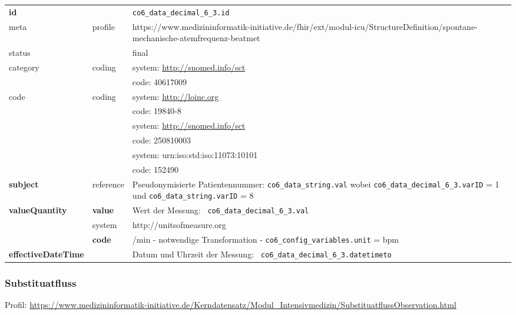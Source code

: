 \begin{longtable}{|l|l|p{7.5cm}|}
        \hline
        \rowcolor{lightgray} \multicolumn{3}{|l|}{Data Mapping (inhaltlich)} \\ \hline
        \textbf{id} &  & \texttt{co6\_data\_decimal\_6\_3.id} \\ \hline
	meta & profile & https://www.medizininformatik-initiative.de/fhir/ext/modul-icu/StructureDefinition/spontane-mechanische-atemfrequenz-beatmet \\ \hline 
	status &  & final   \\ \hline 
	category & coding & system: \url{http://snomed.info/sct} \\
\cline{3-3}
	& & code: 40617009 \\ \hline
	code & coding & system: \url{http://loinc.org} \\ 
	\cline{3-3} 
	&  & code: 19840-8 \\ 
	\cline{3-3} 
	&  & system: \url{http://snomed.info/sct} \\ 
	\cline{3-3}
	&  & code: 250810003 \\ 
	\cline{3-3} 
	&  & system: urn:iso:std:iso:11073:10101 \\ 
	\cline{3-3}
	&  & code: 152490 \\ \hline
	 \textbf{subject} & reference & Pseudonymisierte Patientennummer: \texttt{co6\_data\_string.val} wobei \texttt{co6\_data\_decimal\_6\_3.varID} = 1 und \texttt{co6\_data\_string.varID} = 8 \\ \hline
	 \textbf{valueQuantity}  & \textbf{value} & Wert der Messung: \texttt{
co6\_data\_decimal\_6\_3.val} \\
        \cline{2-3}
         & system & http://unitsofmeasure.org \\
         \cline{2-3}
         & \textbf{code} & /min - notwendige Transformation - \texttt{co6\_config\_variables.unit} = bpm \\ \hline
     \textbf{effectiveDateTime}  & & Datum und Uhrzeit der Messung: \texttt{
co6\_data\_decimal\_6\_3.datetimeto} \\ \hline
\end{longtable}


\subsubsection{Substituatfluss} 

 Profil: \url{https://www.medizininformatik-initiative.de/Kerndatensatz/Modul_Intensivmedizin/SubstituatflussObservation.html}


